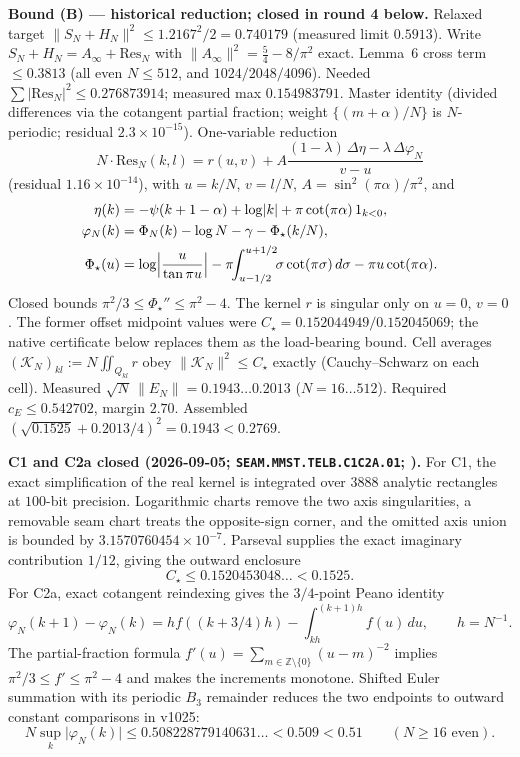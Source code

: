 \documentclass[11pt,a4paper]{article}
\begin{document}
\par\smallskip\noindent\textbf{Bound (B) --- historical reduction; closed in round 4 below.}
Relaxed target $\lVert S_N+H_N\rVert^2\le1.2167^2/2=0.740179$ (measured limit
$0.5913$).  Write $S_N+H_N=A_\infty+\mathrm{Res}_N$ with
$\lVert A_\infty\rVert^2=\tfrac54-8/\pi^2$ exact.  Lemma~6 cross term
${}\le0.3813$ (all even $N\le512$, and $1024/2048/4096$).  Needed
$\sum\lvert\mathrm{Res}_N\rvert^2\le0.276873914$; measured max $0.154983791$.
Master identity (divided differences via the cotangent partial fraction; weight
$\{(m+\alpha)/N\}$ is $N$-periodic; residual $2.3{\times}10^{-15}$).
One-variable reduction
\begin{equation*}
  N\cdot\mathrm{Res}_N(k,l)
  =r(u,v)
  +A\frac{(1-\lambda)\,\Delta\eta-\lambda\,\Delta\varphi_N}{v-u}
\end{equation*}
(residual $1.16{\times}10^{-14}$), with $u=k/N$, $v=l/N$, $A=\sin^2(\pi\alpha)/\pi^2$,
and
\begin{align*}
  \eta(k)
  &=-\psi(k+1-\alpha)+\log\lvert k\rvert+\pi\cot(\pi\alpha)\,1_{k<0},\\
  \varphi_N(k)
  &=\Phi_N(k)-\log N-\gamma-\Phi_\star(k/N),\\
  \Phi_\star(u)
  &=\log\Bigl\lvert\frac{u}{\tan\pi u}\Bigr\rvert
    -\pi\!\!\int_{u-1/2}^{u+1/2}\!\!\sigma\cot(\pi\sigma)\,d\sigma
    -\pi u\cot(\pi\alpha).
\end{align*}
Closed bounds $\pi^2/3\le\Phi_\star''\le\pi^2-4$.  The kernel $r$ is singular
only on $u=0$, $v=0$.  The former offset midpoint values were
$C_\star=0.152044949/0.152045069$; the native certificate below replaces them
as the load-bearing bound.
Cell averages $(\mathcal K_N)_{kl}:=N\iint_{Q_{kl}}r$ obey
$\lVert\mathcal K_N\rVert^2\le C_\star$ exactly (Cauchy--Schwarz on each cell).
Measured $\sqrt N\,\lVert E_N\rVert=0.1943\ldots0.2013$ ($N=16\ldots512$).
Required $c_E\le0.542702$, margin $2.70$.  Assembled
$(\sqrt{0.1525}+0.2013/4)^2=0.1943<0.2769$.

\par\smallskip\noindent\textbf{C1 and C2a closed (2026-09-05;
\texttt{SEAM.MMST.TELB.C1C2A.01};
).}
For C1, the exact simplification of the real kernel is integrated over $3888$
analytic rectangles at $100$-bit precision.  Logarithmic charts remove the two
axis singularities, a removable seam chart treats the opposite-sign corner, and
the omitted axis union is bounded by $3.1570760454{\times}10^{-7}$.  Parseval
supplies the exact imaginary contribution $1/12$, giving the outward enclosure
\[
 C_\star\le0.1520453048\ldots<0.1525.
\]
For C2a, exact cotangent reindexing gives the $3/4$-point Peano identity
\[
 \varphi_N(k+1)-\varphi_N(k)
 =h f((k+3/4)h)-\int_{kh}^{(k+1)h}f(u)\,du,
 \qquad h=N^{-1}.
\]
The partial-fraction formula
$f'(u)=\sum_{m\in\mathbb Z\setminus\{0\}}(u-m)^{-2}$ implies
$\pi^2/3\le f'\le\pi^2-4$ and makes the increments monotone.  Shifted Euler
summation with its periodic $B_3$ remainder reduces the two endpoints to outward
constant comparisons in v1025:
\[
 N\sup_k\lvert\varphi_N(k)\rvert
 \le0.508228779140631\ldots<0.509<0.51
 \qquad(N\ge16\text{ even}).
\]
\end{document}
